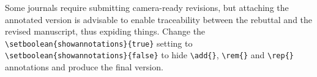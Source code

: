 \documentclass{article}
\begin{document}
Some journals require submitting camera-ready revisions, but attaching the annotated version is advisable to enable traceability between the rebuttal and the revised manuscript, thus expiding things. Change the \verb|\setboolean{showannotations}{true}| setting to \verb|\setboolean{showannotations}{false}| to hide \verb|\add{}|, \verb|\rem{}| and \verb|\rep{}| annotations and produce the final version.




\end{document}
